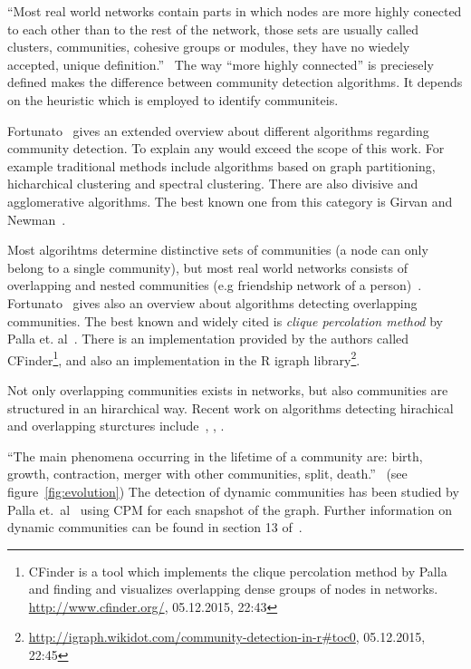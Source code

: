 \documentclass[runningheads,a4paper]{llncs}
\begin{document}
``Most real world networks contain parts in which nodes are more highly conected to each other than to the rest of the network, those sets are usually called clusters, communities, cohesive groups or modules, they have no wiedely accepted, unique definition.''~\cite{palla2005uncovering}
The way ``more highly connected'' is preciesely defined makes the difference between community detection algorithms.
It depends on the heuristic which is employed to identify communiteis.~\cite{porter2009communities}

Fortunato~\cite{fortunato2010community} gives an extended overview about different algorithms regarding community detection.
To explain any would exceed the scope of this work.
For example traditional methods include algorithms based on graph partitioning, hicharchical clustering and spectral clustering.
There are also divisive and agglomerative algorithms.
The best known one from this category is Girvan and Newman~\cite{girvan2002community}.

Most algorihtms determine distinctive sets of communities (a node can only belong to a single community), but most real world networks  consists of overlapping and nested communities (e.g friendship network of a person)~\cite{palla2005uncovering}.
Fortunato~\cite{fortunato2010community} gives also an overview about algorithms detecting overlapping communities.
The best known and widely cited is \emph{clique percolation method} by Palla et. al~\cite{palla2005uncovering}.
There is an implementation provided by the authors called CFinder\footnote{CFinder is a tool which implements the clique percolation method by Palla and finding and visualizes overlapping dense groups of nodes in networks. \url{http://www.cfinder.org/}, 05.12.2015, 22:43}, and also an implementation in the R igraph library\footnote{\url{http://igraph.wikidot.com/community-detection-in-r#toc0}, 05.12.2015, 22:45}.

Not only overlapping communities exists in networks, but also communities are structured in an hirarchical way.
Recent work on algorithms detecting hirachical and overlapping sturctures  include~\cite{1367-2630-11-3-033015}, \cite{Cui201485}, \cite{Shen20091706}.

``The main phenomena occurring in the lifetime of a community are: birth, growth, contraction, merger with other communities, split, death.''~\cite{fortunato2010community} (see figure~\ref{fig:evolution})
The detection of dynamic communities has been studied by Palla et.~al~\cite{palla2007quantifying} using CPM for each snapshot of the graph. Further information on dynamic communities can be found in section 13 of~\cite{fortunato2010community}.
\end{document}
